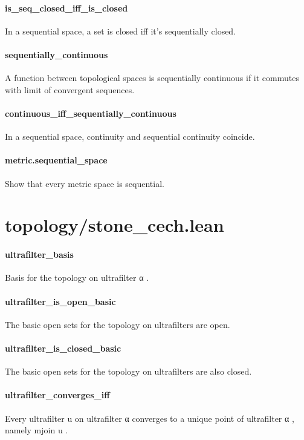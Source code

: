 \documentclass{article}
\begin{document}
\paragraph{is\_seq\_closed\_iff\_is\_closed}
\par
In a sequential space, a set is closed iff it's sequentially closed.
\paragraph{sequentially\_continuous}
\par
A function between topological spaces is sequentially continuous if it commutes with limit of
convergent sequences.
\paragraph{continuous\_iff\_sequentially\_continuous}
\par
In a sequential space, continuity and sequential continuity coincide.
\paragraph{metric.sequential\_space}
\par
Show that every metric space is sequential.
\section{topology/stone\_cech.lean}\paragraph{ultrafilter\_basis}
\par
Basis for the topology on 
\colorbox[RGB]{253,246,227}{{{{\color[RGB]{101, 123, 131} ultrafilter α }}}}.
\paragraph{ultrafilter\_is\_open\_basic}
\par
The basic open sets for the topology on ultrafilters are open.
\paragraph{ultrafilter\_is\_closed\_basic}
\par
The basic open sets for the topology on ultrafilters are also closed.
\paragraph{ultrafilter\_converges\_iff}
\par
Every ultrafilter 
\colorbox[RGB]{253,246,227}{{{{\color[RGB]{101, 123, 131} u }}}} on 
\colorbox[RGB]{253,246,227}{{{{\color[RGB]{101, 123, 131} ultrafilter α }}}} converges to a unique
point of 
\colorbox[RGB]{253,246,227}{{{{\color[RGB]{101, 123, 131} ultrafilter α }}}}, namely 
\colorbox[RGB]{253,246,227}{{{{\color[RGB]{101, 123, 131} mjoin u }}}}.
\end{document}

